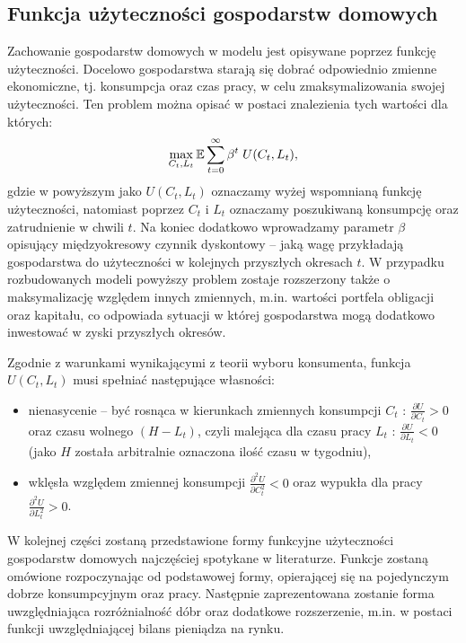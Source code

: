 \subsection{Funkcja użyteczności gospodarstw domowych}

Zachowanie gospodarstw domowych w modelu jest opisywane poprzez funkcję użyteczności. Docelowo gospodarstwa starają się dobrać odpowiednio zmienne ekonomiczne, tj. konsumpcja oraz czas pracy, w celu zmaksymalizowania swojej użyteczności. Ten problem można opisać w postaci znalezienia tych wartości dla których:
\begin{equation}
    \max_{C_t,L_t}\mathbb{E} \sum_{t=0}^{\infty} \beta^t\;U(C_t,L_t),
\end{equation}
gdzie w powyższym jako $U(C_t,L_t)$ oznaczamy wyżej wspomnianą funkcję użyteczności, natomiast poprzez $C_t$ i $L_t$ oznaczamy poszukiwaną konsumpcję oraz zatrudnienie w chwili $t$. Na koniec dodatkowo wprowadzamy parametr $\beta$ opisujący międzyokresowy czynnik dyskontowy -- jaką wagę przykładają gospodarstwa do użyteczności w kolejnych przyszłych okresach $t$. W przypadku rozbudowanych modeli powyższy problem zostaje rozszerzony także o maksymalizację względem innych zmiennych, m.in. wartości portfela obligacji oraz kapitału, co odpowiada sytuacji w której gospodarstwa mogą dodatkowo inwestować w zyski przyszłych okresów.

Zgodnie z warunkami wynikającymi z teorii wyboru konsumenta, funkcja $U(C_t, L_t)$ musi spełniać następujące własności:
\begin{itemize}
    \item nienasycenie -- być rosnąca w kierunkach zmiennych konsumpcji $C_t$ : $\frac{\partial U}{\partial C_t} > 0$ oraz czasu wolnego $(H - L_t)$, czyli malejąca dla czasu pracy $L_t$ :  $\frac{\partial U}{\partial L_t} < 0$(jako $H$ została arbitralnie oznaczona ilość czasu w tygodniu),
    \item wklęsła względem zmiennej konsumpcji $\frac{\partial ^2 U}{\partial C_t^2} < 0$ oraz wypukła dla pracy $\frac{\partial ^2 U}{\partial L_t^2} > 0$.
\end{itemize}

W kolejnej części zostaną przedstawione formy funkcyjne użyteczności gospodarstw domowych najczęściej spotykane w literaturze. Funkcje zostaną omówione rozpoczynając od podstawowej formy, opierającej się na pojedynczym dobrze konsumpcyjnym oraz pracy. Następnie zaprezentowana zostanie forma uwzględniająca rozróżnialność dóbr oraz dodatkowe rozszerzenie, m.in. w postaci funkcji uwzględniającej bilans pieniądza na rynku.

